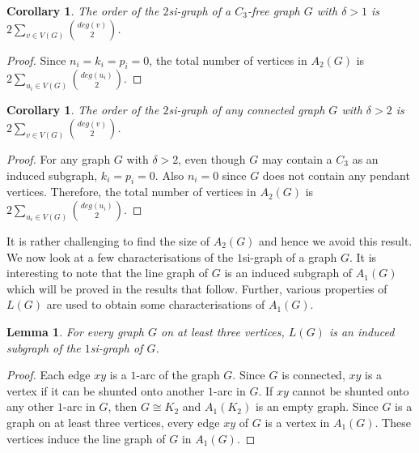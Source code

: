 \documentclass[12pt,a4paper,twoside]{article}
\newtheorem{lemma}[theorem]{Lemma}
\newtheorem{corollary}[theorem]{Corollary}
\theoremstyle{casesty}
\theoremstyle{subcasesty}
\theoremstyle{schemesty}
\begin{document}
\begin{corollary} \label{Asnumber2cor1}
	The order of the $2$si-graph of a $C_{3}$-free graph $G$ with $\delta > 1$ is $2\sum\limits_{v \in V(G)} {deg(v) \choose 2}$.
\end{corollary}
\begin{proof}
	Since $n_{i}=k_{i}=p_{i}=0$, the total number of vertices in $A_{2}(G)$ is $2\sum\limits_{u_{i} \in V(G)} {deg(u_{i}) \choose 2}$.
\end{proof}

\begin{corollary} \label{Asnumber2cor2}
	The order of the $2$si-graph of any connected graph $G$ with $\delta > 2$ is $2\sum\limits_{v \in V(G)} {deg(v) \choose 2}$.
\end{corollary}
\begin{proof}
	For any graph $G$ with $\delta > 2$, even though $G$ may contain a $C_{3}$ as an induced subgraph, $k_{i}=p_{i}=0$. Also $n_{i}=0$ since $G$ does not contain any pendant vertices. Therefore, the total number of vertices in $A_{2}(G)$ is $2\sum\limits_{u_{i} \in V(G)} {deg(u_{i}) \choose 2}$.
\end{proof}

It is rather challenging to find the size of $A_{2}(G)$ and hence we avoid this result. We now look at a few characterisations of the $1$si-graph of a graph $G$. It is interesting to note that the line graph of $G$ is an induced subgraph of $A_{1}(G)$ which will be proved in the results that follow. Further, various properties of $L(G)$ are used to obtain some characterisations of $A_{1}(G)$.

\begin{lemma} \label{1arcsubgraph}
	For every graph $G$ on at least three vertices, $L(G)$ is an induced subgraph of the $1$si-graph of $G$.
\end{lemma}
\begin{proof}
	Each edge $xy$ is a $1$-arc of the graph $G$. Since $G$ is connected, $xy$ is a vertex if it can be shunted onto another $1$-arc in $G$. If $xy$ cannot be shunted onto any other $1$-arc in $G$, then $G \cong K_{2}$ and $A_{1}(K_{2})$ is an empty graph. Since $G$ is a graph on at least three vertices, every edge $xy$ of $G$ is a vertex in $A_{1}(G)$. These vertices induce the line graph of $G$ in $A_{1}(G)$.
\end{proof}
\end{document}
